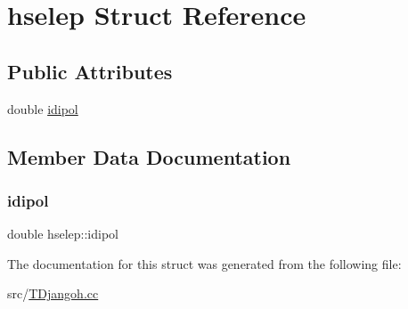 \hypertarget{structhselep}{}\section{hselep Struct Reference}
\label{structhselep}
\subsection*{Public Attributes}
\begin{DoxyCompactItemize}
\item 
double \hyperlink{structhselep_a73a01b98e67ffc2a196aad973f721e72}{idipol}
\end{DoxyCompactItemize}


\subsection{Member Data Documentation}
\mbox{\label{structhselep_a73a01b98e67ffc2a196aad973f721e72}} 
\subsubsection{\texorpdfstring{idipol}{idipol}}
{\footnotesize\ttfamily double hselep\+::idipol}



The documentation for this struct was generated from the following file\+:\begin{DoxyCompactItemize}
\item 
src/\hyperlink{_t_djangoh_8cc}{T\+Djangoh.\+cc}\end{DoxyCompactItemize}
